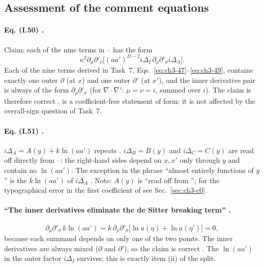 \subsection{Assessment of the comment equations}

\paragraph{Eq. (I.50) \tC.}
Claim: each of the nine terms in -- has the form
\begin{equation*}
\kappa^2\partial_\mu\partial'_\nu\big[(aa')^{D-2}i\Delta_I\,\partial_\rho\partial'_\sigma i\Delta_A\big].
\end{equation*}
Each of the nine terms derived in Task~7, Eqs.~\eqref{eq:ch3-47}--\eqref{eq:ch3-49}, contains exactly one outer $\partial$ (at $x$) and one outer $\partial'$ (at $x'$), and the
inner derivative pair is always of the form $\partial_\rho\partial'_\sigma$ (for $\nabla\!\cdot\!\nabla'$: $\mu=\nu=i$, summed over $i$). The claim is therefore correct \chIIIok.
 is a coefficient-free statement of form; it is not affected by the overall-sign question of Task~7.

\paragraph{Eq. (I.51) \tC.}
$i\Delta_A=A(y)+k\ln(aa')$ repeats . $i\Delta_B=B(y)$ and $i\Delta_C=C(y)$ are read off directly from --: the right-hand sides depend on $x,x'$ only
through $y$ and contain no $\ln(aa')$. The exception in the phrase ``almost entirely functions of $y$'' is the $k\ln(aa')$ of $i\Delta_A$ \chIIIok.
Note: $A(y)$ is ``read off from ''; for the typographical error in the first coefficient of  see Sec.~\ref{sec:ch3-c0}.

\paragraph{``The inner derivatives eliminate the de Sitter breaking term'' \tD.}
\begin{equation}
\partial_\rho\partial'_\sigma\,k\ln(aa')=k\,\partial_\rho\partial'_\sigma\big[\ln a(\eta)+\ln a(\eta')\big]=0,
\label{eq:ch3-lnkill}
\end{equation}
because each summand depends on only one of the two points. The inner derivatives are always mixed ($\partial$ and $\partial'$), so the claim is correct \chIIIok.
The $\ln(aa')$ in the outer factor $i\Delta_I$ survives; this is exactly item (ii) of the split.

